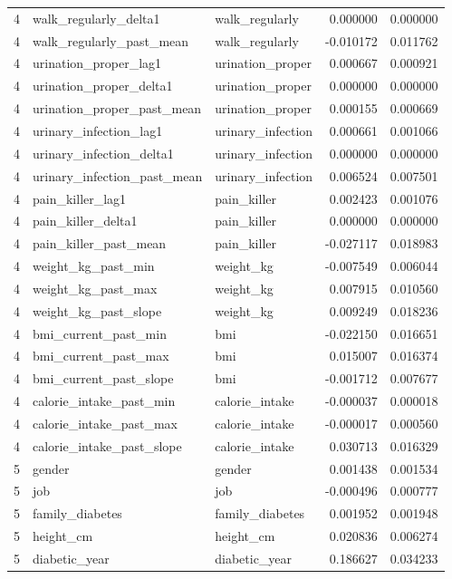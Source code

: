 \begin{longtable}{rllrr}
4 & walk\_regularly\_delta1 & walk\_regularly & 0.000000 & 0.000000 \\
4 & walk\_regularly\_past\_mean & walk\_regularly & -0.010172 & 0.011762 \\
4 & urination\_proper\_lag1 & urination\_proper & 0.000667 & 0.000921 \\
4 & urination\_proper\_delta1 & urination\_proper & 0.000000 & 0.000000 \\
4 & urination\_proper\_past\_mean & urination\_proper & 0.000155 & 0.000669 \\
4 & urinary\_infection\_lag1 & urinary\_infection & 0.000661 & 0.001066 \\
4 & urinary\_infection\_delta1 & urinary\_infection & 0.000000 & 0.000000 \\
4 & urinary\_infection\_past\_mean & urinary\_infection & 0.006524 & 0.007501 \\
4 & pain\_killer\_lag1 & pain\_killer & 0.002423 & 0.001076 \\
4 & pain\_killer\_delta1 & pain\_killer & 0.000000 & 0.000000 \\
4 & pain\_killer\_past\_mean & pain\_killer & -0.027117 & 0.018983 \\
4 & weight\_kg\_past\_min & weight\_kg & -0.007549 & 0.006044 \\
4 & weight\_kg\_past\_max & weight\_kg & 0.007915 & 0.010560 \\
4 & weight\_kg\_past\_slope & weight\_kg & 0.009249 & 0.018236 \\
4 & bmi\_current\_past\_min & bmi & -0.022150 & 0.016651 \\
4 & bmi\_current\_past\_max & bmi & 0.015007 & 0.016374 \\
4 & bmi\_current\_past\_slope & bmi & -0.001712 & 0.007677 \\
4 & calorie\_intake\_past\_min & calorie\_intake & -0.000037 & 0.000018 \\
4 & calorie\_intake\_past\_max & calorie\_intake & -0.000017 & 0.000560 \\
4 & calorie\_intake\_past\_slope & calorie\_intake & 0.030713 & 0.016329 \\
5 & gender & gender & 0.001438 & 0.001534 \\
5 & job & job & -0.000496 & 0.000777 \\
5 & family\_diabetes & family\_diabetes & 0.001952 & 0.001948 \\
5 & height\_cm & height\_cm & 0.020836 & 0.006274 \\
5 & diabetic\_year & diabetic\_year & 0.186627 & 0.034233 \\

\end{longtable}

